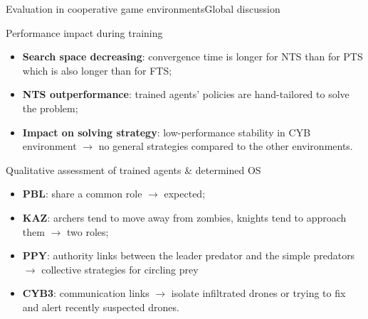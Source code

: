 \begin{frame}{Evaluation in cooperative game environments}{Global discussion}

    \begin{block}{Performance impact during training}
        \begin{itemize}
            \item \textbf{Search space decreasing}: convergence time is longer for NTS than for PTS which is also longer than for FTS;
            \item \textbf{NTS outperformance}: trained agents' policies are hand-tailored to solve the problem;
            \item \textbf{Impact on solving strategy}: low-performance stability in CYB environment $\rightarrow$ no general strategies compared to the other environments.
        \end{itemize}
    \end{block}

    \begin{block}{Qualitative assessment of trained agents \& determined OS}
        \begin{itemize}
            \item \textbf{PBL}: share a common role $\rightarrow$ expected;
            \item \textbf{KAZ}: archers tend to move away from zombies, knights tend to approach them $\rightarrow$ two roles;
            \item \textbf{PPY}: authority links between the leader predator and the simple predators $\rightarrow$ collective strategies for circling prey
            \item \textbf{CYB3}: communication links $\rightarrow$ isolate infiltrated drones or trying to fix and alert recently suspected drones.
        \end{itemize}
    \end{block}

\end{frame}

